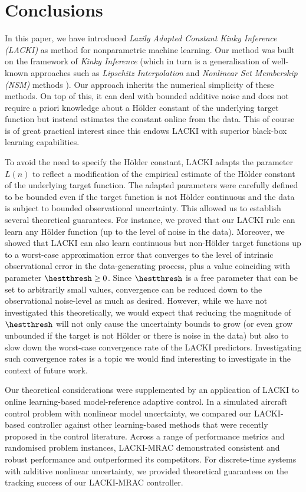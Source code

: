 \section{Conclusions}
In this paper, we have introduced \emph{Lazily Adapted Constant Kinky Inference (LACKI)} as method for nonparametric machine learning. Our method was built on the framework of \emph{Kinky Inference} (which in turn is a generalisation of well-known approaches such as \emph{Lipschitz Interpolation} \cite{Zabinsky2003,Beliakov2006} and \emph{Nonlinear Set Membership (NSM)}  methods \cite{Milanese2004}). 
 Our approach inherits the numerical simplicity of these methods. On top of this, it can deal with bounded additive noise and does not require a priori knowledge about a H\"older constant of the underlying target function but instead estimates the constant online from the data. This of course is of great practical interest since this endows LACKI with superior black-box learning capabilities.
 
To avoid the need to specify the H\"older constant, LACKI adapts the parameter $L(n)$ to reflect a modification of the empirical estimate of the H\"older constant of the underlying target function. 
The adapted parameters were carefully defined to be bounded even if the target function is not H\"older continuous and the data is subject to bounded observational uncertainty.
This allowed us to establish several theoretical guarantees. For instance, we proved that our LACKI rule can learn any H\"older function (up to the level of noise in the data). Moreover, we showed that LACKI can also learn continuous but non-H\"older target functions up to a worst-case approximation error that converges to the level of intrinsic observational  error in the data-generating process, plus a value coinciding with parameter $\hestthresh \geq 0$. Since 
$\hestthresh$ is a free parameter that can be set to arbitrarily small values, convergence can be reduced down to the observational noise-level as much as desired. However, while we have not investigated this theoretically, we would expect that reducing the magnitude of $\hestthresh$ will not only cause the uncertainty bounds to grow (or even grow unbounded if the target is not H\"older or there is noise in the data) but also to slow down the worst-case convergence rate of the LACKI predictors. 
Investigating such convergence rates is a topic we would find interesting to investigate in the context of future work. 

Our theoretical considerations were supplemented by an application of LACKI to 
online learning-based model-reference adaptive control. In a simulated aircraft control problem with nonlinear model uncertainty, we compared our LACKI-based controller against other learning-based methods that were recently proposed in the control literature. Across a range of performance metrics and randomised problem instances, LACKI-MRAC demonstrated consistent and robust performance and outperformed its competitors.
For discrete-time systems with additive nonlinear uncertainty, we provided theoretical guarantees on the tracking success of our LACKI-MRAC controller.

